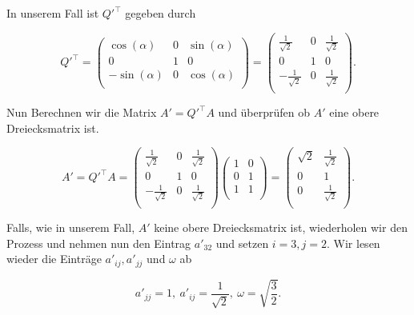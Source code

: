 In unserem Fall ist \( Q'^\top \) gegeben durch

\begin{equation*}
    Q'^\top = \begin{pmatrix}
        \cos(\alpha) & 0 & \sin(\alpha) \\
        0 & 1 & 0 \\
        - \sin(\alpha) & 0 & \cos(\alpha) \\
    \end{pmatrix} =
    \begin{pmatrix}
        \frac{1}{\sqrt{2}} & 0 & \frac{1}{\sqrt{2}} \\
        0 & 1 & 0 \\
        -\frac{1}{\sqrt{2}} & 0 & \frac{1}{\sqrt{2}} \\
    \end{pmatrix}.
\end{equation*}

Nun Berechnen wir die Matrix \( A' = Q'^\top A \) und überprüfen ob \( A' \) eine obere Dreiecksmatrix ist.

\begin{equation*}
    A' = Q'^\top A = 
    \begin{pmatrix}
        \frac{1}{\sqrt{2}} & 0 & \frac{1}{\sqrt{2}} \\
        0 & 1 & 0 \\
        -\frac{1}{\sqrt{2}} & 0 & \frac{1}{\sqrt{2}} \\
    \end{pmatrix}
    \begin{pmatrix}
        1 & 0 \\
        0 & 1 \\
        1 & 1 \\
    \end{pmatrix} = 
    \begin{pmatrix}
        \sqrt{2} & \frac{1}{\sqrt{2}} \\
        0 & 1 \\
        0 & \frac{1}{\sqrt{2}} \\
    \end{pmatrix}.
\end{equation*}

Falls, wie in unserem Fall, \( A' \) keine obere Dreiecksmatrix ist, wiederholen wir den Prozess und nehmen nun den Eintrag \( a'_{32} \) und setzen \( i = 3, j = 2 \). Wir lesen wieder die Einträge \( a'_{ij}, a'_{jj} \) und \( \omega \) ab

\begin{equation*}
    a'_{jj} = 1, \ a'_{ij} = \frac{1}{\sqrt{2}}, \ \omega = \sqrt{\frac{3}{2}}.
\end{equation*}

